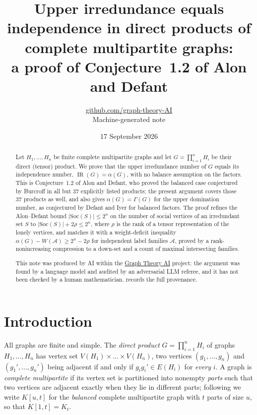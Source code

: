 \documentclass[11pt,a4paper]{article}
\title{Upper irredundance equals independence in direct products of complete multipartite graphs:\\ a proof of Conjecture~1.2 of Alon and Defant}
\author{\href{https://github.com/graph-theory-AI}{github.com/graph-theory-AI}\\[2pt] \normalsize Machine-generated note}
\date{17 September 2026}
\theoremstyle{plain}
\theoremstyle{definition}
\theoremstyle{remark}
\newcommand{\IR}{\operatorname{IR}}
\newcommand{\cA}{\mathcal A}
\newcommand{\rk}{\rho}
\newcommand{\Kmp}[1]{K[#1]}
\begin{document}
\maketitle

\begin{abstract}
Let $H_1,\dots,H_n$ be finite complete multipartite graphs and let $G=\prod_{i=1}^nH_i$ be their direct (tensor) product. We prove that the upper irredundance number of $G$ equals its independence number, $\IR(G)=\alpha(G)$, with no balance assumption on the factors. This is Conjecture~1.2 of Alon and Defant, who proved the balanced case conjectured by Burcroff in all but $37$ explicitly listed products; the present argument covers those $37$ products as well, and also gives $\alpha(G)=\Gamma(G)$ for the upper domination number, as conjectured by Defant and Iyer for balanced factors. The proof refines the Alon--Defant bound $|\mathrm{Soc}(S)|\le 2^n$ on the number of social vertices of an irredundant set $S$ to $|\mathrm{Soc}(S)|+2\rk\le 2^n$, where $\rk$ is the rank of a tensor representation of the lonely vertices, and matches it with a weight-deficit inequality $\alpha(G)-W(\cA)\ge 2^n-2\rk$ for independent label families $\cA$, proved by a rank-nonincreasing compression to a down-set and a count of maximal intersecting families.

\medskip\noindent\small
This note was produced by AI within the \href{https://github.com/graph-theory-AI/Graph-Theory-LLM-Proofs}{Graph Theory AI} project:
the argument was found by a language model and audited by an adversarial LLM
referee, and it has not been checked by a human mathematician.
 records the full provenance.
\end{abstract}

\section{Introduction}

All graphs are finite and simple. The \emph{direct product} $G=\prod_{i=1}^nH_i$ of graphs $H_1,\dots,H_n$ has vertex set $V(H_1)\times\dots\times V(H_n)$, two vertices $(g_1,\dots,g_n)$ and $(g_1',\dots,g_n')$ being adjacent if and only if $g_ig_i'\in E(H_i)$ for \emph{every} $i$. A graph is \emph{complete multipartite} if its vertex set is partitioned into nonempty \emph{parts} such that two vertices are adjacent exactly when they lie in different parts; following \cite{AD20} we write $\Kmp{u,t}$ for the \emph{balanced} complete multipartite graph with $t$ parts of size $u$, so that $\Kmp{1,t}=K_t$.
\end{document}

